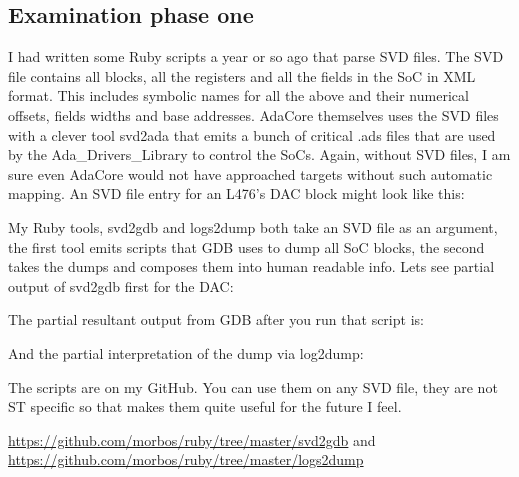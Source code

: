 \documentclass[11pt]{article}
\numberwithin{figure}{section}
\begin{document}
\subsection{Examination phase one}
I had written some Ruby scripts a year or so ago that parse SVD
files. The SVD file contains all blocks, all the registers and all the
fields in the SoC in XML format. This includes symbolic names for all
the above and their numerical offsets, fields widths and base
addresses. AdaCore themselves uses the SVD files with a clever tool
svd2ada that emits a bunch of critical {.ads} files that are used by
the Ada\_Drivers\_Library to control the SoCs. Again, without SVD
files, I am sure even AdaCore would not have approached targets
without such automatic mapping. An SVD file entry for an L476's DAC
block might look like this:
{
\selectfont

}

My Ruby tools, svd2gdb and logs2dump both take an SVD file as an
argument, the first tool emits scripts that GDB uses to dump all SoC
blocks, the second takes the dumps and composes them into human
readable info. Lets see partial output of svd2gdb first for the DAC:

{
\selectfont

}

\clearpage
The partial resultant output from GDB after you run that script is:

{
\selectfont

}

And the partial interpretation of the dump via log2dump:

{
\selectfont

}

The scripts are on my GitHub. You can use them on any SVD file, they
are not ST specific so that makes them quite useful for the future I feel.

\url{https://github.com/morbos/ruby/tree/master/svd2gdb} and \url{https://github.com/morbos/ruby/tree/master/logs2dump}
\end{document}

